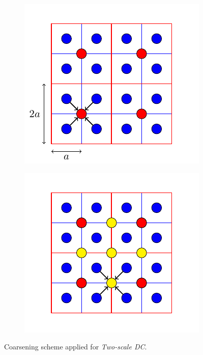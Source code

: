 \begin{figure}
\begin{subfigure}{.45\textwidth}
\begin{center}
\includegraphics[scale=1]{Pictures/tikzCoarsen/coarsen.pdf}
\end{center}
\label{sfig:coarsenA}
\end{subfigure}\hfill
\begin{subfigure}{.45\textwidth}
\begin{center}
\includegraphics[scale=1]{Pictures/tikzCoarsen/coarsenMani.pdf}
\end{center}
\label{sfig:coarsenB}
\end{subfigure}
\caption{Coarsening scheme applied for \emph{Two-scale \acl{DC}}.}
\label{fig:coarsen}
\end{figure}
